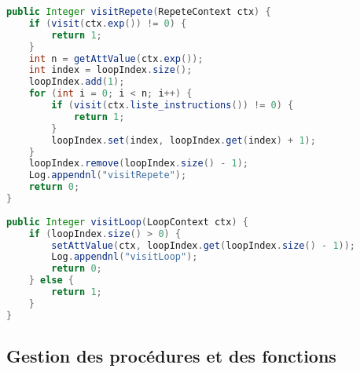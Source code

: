 \documentclass[a4paper,11pt]{article}
\begin{document}
\begin{lstlisting}[language=Java]
public Integer visitRepete(RepeteContext ctx) {
    if (visit(ctx.exp()) != 0) {
        return 1;
    }
    int n = getAttValue(ctx.exp());
    int index = loopIndex.size();
    loopIndex.add(1);
    for (int i = 0; i < n; i++) {
        if (visit(ctx.liste_instructions()) != 0) {
            return 1;
        }
        loopIndex.set(index, loopIndex.get(index) + 1);
    }
    loopIndex.remove(loopIndex.size() - 1);
    Log.appendnl("visitRepete");
    return 0;
}
    
public Integer visitLoop(LoopContext ctx) {
    if (loopIndex.size() > 0) {
        setAttValue(ctx, loopIndex.get(loopIndex.size() - 1));
        Log.appendnl("visitLoop");
        return 0;
    } else {
        return 1;
    }
}
\end{lstlisting}

\subsection{Gestion des procédures et des fonctions}
\end{document}
